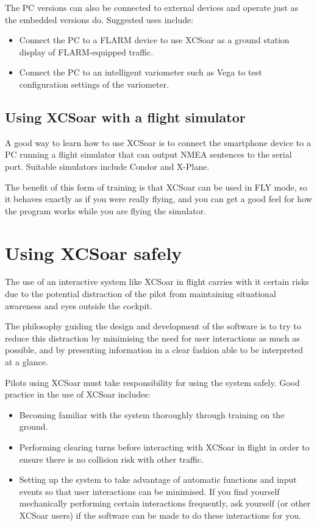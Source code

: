 The PC versions can also be connected to external devices and operate just as
the embedded versions do. Suggested uses include:
\begin{itemize}
\item Connect the PC to a FLARM device to use XCSoar as a ground
station display of FLARM-equipped traffic.
\item Connect the PC to an intelligent variometer such as Vega to
test configuration settings of the variometer.
\end{itemize}

\subsection*{Using XCSoar with a flight simulator}
A good way to learn how to use XCSoar is to connect the smartphone
device to a PC running a flight simulator that can output NMEA
sentences to the serial port. Suitable simulators include Condor and
X-Plane.  

The benefit of this form of training is that XCSoar can be used in FLY
mode, so it behaves exactly as if you were really flying, and you can
get a good feel for how the program works while you are flying the
simulator.

\section{Using XCSoar safely}\label{sec:usingxcsoarsafely}\label{conf:usingxcsoarsafely}
The use of an interactive system like XCSoar in flight carries with it
certain risks due to the potential distraction of the pilot from
maintaining situational awareness and eyes outside the cockpit.

The philosophy guiding the design and development of the software is
to try to reduce this distraction by minimising the need for user
interactions as much as possible, and by presenting information in a
clear fashion able to be interpreted at a glance.

Pilots using XCSoar must take responsibility for using the system safely.
Good practice in the use of XCSoar includes:
\begin{itemize}
\item Becoming familiar with the system thoroughly through training on 
  the ground.
\item Performing clearing turns before interacting with XCSoar in flight
  in order to ensure there is no collision risk with other traffic.
\item Setting up the system to take advantage of automatic functions
  and input events so that user interactions can be minimised.  If you
  find yourself mechanically performing certain interactions frequently,
  ask yourself (or other XCSoar users) if the software can be made to do 
  these interactions for you.
\end{itemize}
